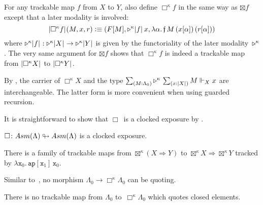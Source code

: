 \documentclass[draft,a4paper,UKenglish,numberwithinsect,cleveref,thm-restate]{lipics-v2021}
\numberwithin{equation}{section}
\theoremstyle{definition}
\theoremstyle{plain}
\newtheorem*{notation*}{Notation}
\begin{document}

For any trackable map $f$ from $X$ to $Y$, also define $\Box^\kappa f$ in the same way as $\boxtimes f$ except that a later modality is involved: 
\[
  \mathopen{}\left|\Box^\kappa f\right|_{}^{}\mathclose{}(M, x, r) \vcentcolon\equiv (F[M], \mathord{\triangleright}^\kappa \mathopen{}\left|f\right|_{}^{}\mathclose{}\, x, \lambda \alpha.\, \mathfrak{f}\,M\,(x[\alpha])\,(r[\alpha]))
\]
where $\mathord{\triangleright}^\kappa \mathopen{}\left|f\right|_{}^{}\mathclose{} : \mathord{\triangleright}^\kappa \mathopen{}\left|X\right|_{}^{}\mathclose{} \to \mathord{\triangleright}^\kappa \mathopen{}\left|Y\right|_{}^{}\mathclose{}$ is given by the functoriality of the later modality~$\mathord{\mathord{\triangleright}}^\kappa$.
The very same argument for $\boxtimes f$ shows that $\Box^\kappa f$ is indeed a trackable map from $\mathopen{}\left|\Box^\kappa X\right|_{}^{}\mathclose{}$ to $\mathopen{}\left|\Box^\kappa Y\right|_{}^{}\mathclose{}$.

\begin{remark*}
  By , the carrier of $\Box^\kappa X$ and the type $\sm{M : \Lambda_0}\laterp^\kappa\, \sm{x : \bproj{X}} M \Vdash_X x$ are interchangeable.
  The latter form is more convenient when using guarded recursion.
\end{remark*}

It is straightforward to show that $\Box$~is a clocked exposure by .
\begin{theorem}\label{thm:GL-exposure}
  $\Box \colon \Asm(\Lambda) \looparrowright \Asm(\Lambda)$ is a clocked exposure.
\end{theorem}

\begin{proposition}
There is a family of trackable maps
from $\boxtimes^\kappa (X \Rightarrow Y)$ to $\boxtimes^\kappa X \Rightarrow \boxtimes^\kappa Y$  tracked by $\lambda \mathtt{x}_0.\, \mathtt{ap}[\mathtt{x}_1] \, \mathtt{x}_0$.
\end{proposition}

Similar to~, no morphism $\Lambda_0 \to \Box^\kappa \Lambda_0$ can be quoting.
\begin{theorem}\label{thm:GL-no-quoting}
  There is no trackable map from $\Lambda_0$ to~$\Box^\kappa \Lambda_0$ which quotes closed elements.
\end{theorem}
\end{document}
